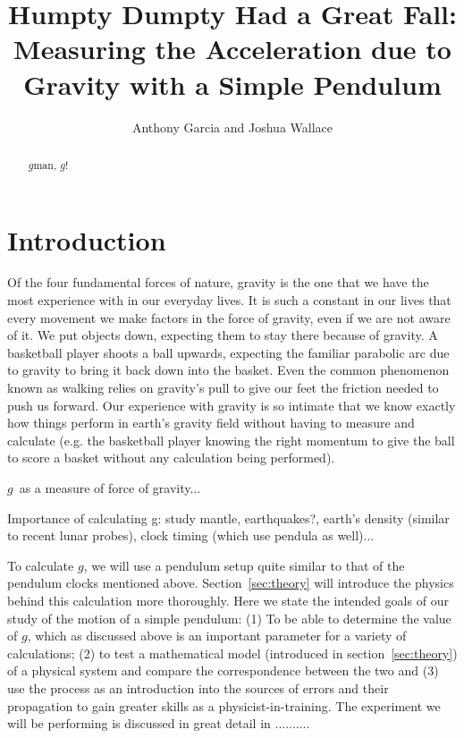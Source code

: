 \documentclass[iop]{emulateapj}
\def\g{$g$}
\begin{document}
\title{Humpty Dumpty Had a Great Fall: Measuring the Acceleration due to Gravity with a Simple Pendulum}


\author{ Anthony Garcia
and
Joshua Wallace}


\begin{abstract}


\g man, \g!


\end{abstract}


\section{Introduction}


Of the four fundamental forces of nature, gravity is the one that we have the 
most experience with in our everyday lives.  It is such a constant in our lives 
that every movement we make factors in the force of gravity, even if we are not
aware of it. We put objects down, expecting them to stay there because of 
gravity. A basketball player shoots a ball upwards, expecting the familiar 
parabolic arc due to gravity to bring it back down into the basket.  Even the
common phenomenon known as walking relies on gravity's pull to give our feet
the friction needed to push us forward. Our experience with gravity is so
intimate that we know exactly how things perform in earth's gravity field 
without having to measure and calculate (e.g. the basketball player knowing the 
right momentum to give the ball to score a basket without any calculation being
performed).


\g\ as a measure of force of gravity...


Importance of calculating g:  study mantle, earthquakes?, earth's density 
(similar to recent lunar probes), clock timing (which use pendula as well)...


To calculate \g, we will use a pendulum setup quite similar to that of the
pendulum clocks mentioned above.  Section~\ref{sec:theory} will introduce the 
physics behind this calculation more thoroughly.  Here we state the intended 
goals of our study of the motion of a simple pendulum:  (1) To be able to 
determine the value of \g, which as discussed above is an important parameter
for a variety of calculations; (2) to test a mathematical model (introduced in 
section~\ref{sec:theory}) of a physical system and compare the correspondence 
between the two and (3) use the process as an introduction into the sources of 
errors and their propagation to gain greater skills as a physicist-in-training. 
The experiment we will be performing is discussed in great detail in .......... 
\end{document}
